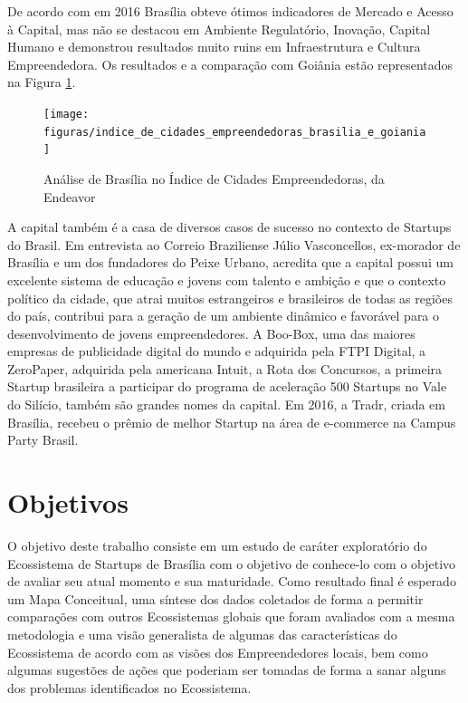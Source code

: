 De acordo com  em 2016 Brasília obteve ótimos indicadores de Mercado e Acesso à Capital, mas não se destacou em Ambiente Regulatório, Inovação, Capital Humano e demonstrou resultados muito ruins em Infraestrutura e Cultura Empreendedora. Os resultados e a comparação com Goiânia estão representados na Figura \ref{figure:indice_de_cidades_empreendedoras_brasilia_e_goiania}.

\begin{figure}[!htb] 
\centering
\texttt{[image: figuras/indice\_de\_cidades\_empreendedoras\_brasilia\_e\_goiania]}
\caption{Análise de Brasília no Índice de Cidades Empreendedoras, da Endeavor}
\label{figure:indice_de_cidades_empreendedoras_brasilia_e_goiania}
\end{figure}

A capital também é a casa de diversos casos de sucesso no contexto de Startups do Brasil. Em entrevista ao Correio Braziliense Júlio Vasconcellos, ex-morador de Brasília e um dos fundadores do Peixe Urbano, acredita que a capital possui um excelente sistema de educação e jovens com talento e ambição e que o contexto político da cidade, que atrai muitos estrangeiros e brasileiros de todas as regiões do país, contribui para a geração de um ambiente dinâmico e favorável para o desenvolvimento de jovens empreendedores. A Boo-Box, uma das maiores empresas de publicidade digital do mundo e adquirida pela FTPI Digital, a ZeroPaper, adquirida pela americana Intuit, a Rota dos Concursos, a primeira Startup brasileira a participar do programa de aceleração 500 Startups no Vale do Silício, também são grandes nomes da capital. Em 2016, a Tradr, criada em Brasília, recebeu o prêmio de melhor Startup na área de e-commerce na Campus Party Brasil.

\section{Objetivos}
\label{section:objetivos}

O objetivo deste trabalho consiste em um estudo de caráter exploratório do Ecossistema de Startups de Brasília com o objetivo de conhece-lo com o objetivo de avaliar seu atual momento e sua maturidade. Como resultado final é esperado um Mapa Conceitual, uma síntese dos dados coletados de forma a permitir comparações com outros Ecossistemas globais que foram avaliados com a mesma metodologia e uma visão generalista de algumas das características do Ecossistema de acordo com as visões dos Empreendedores locais, bem como algumas sugestões de ações que poderiam ser tomadas de forma a sanar alguns dos problemas identificados no Ecossistema.

